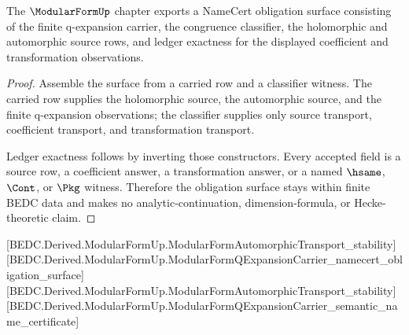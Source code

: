 \begin{theorem}
\label{thm:modularform-namecert-obligation-surface}
The $\ModularFormUp$ chapter exports a NameCert obligation surface consisting of the finite q-expansion carrier, the congruence classifier, the holomorphic and automorphic source rows, and ledger exactness for the displayed coefficient and transformation observations.
\end{theorem}
\begin{proof}
Assemble the surface from a carried row and a classifier witness. The carried row supplies the holomorphic source, the automorphic source, and the finite q-expansion observations; the classifier supplies only source transport, coefficient transport, and transformation transport.

Ledger exactness follows by inverting those constructors. Every accepted field is a source row, a coefficient answer, a transformation answer, or a named $\hsame$, $\Cont$, or $\Pkg$ witness. Therefore the obligation surface stays within finite BEDC data and makes no analytic-continuation, dimension-formula, or Hecke-theoretic claim.
\end{proof}

[BEDC.Derived.ModularFormUp.ModularFormAutomorphicTransport\_stability]
[BEDC.Derived.ModularFormUp.ModularFormQExpansionCarrier\_namecert\_obligation\_surface]
[BEDC.Derived.ModularFormUp.ModularFormAutomorphicTransport\_stability]
[BEDC.Derived.ModularFormUp.ModularFormQExpansionCarrier\_semantic\_name\_certificate]

\begin{closurestatus}{\ModularFormUp}
  \theoryclosure{\publicClosure}
  \formalstatus{\axiomCleanV}
\end{closurestatus}

